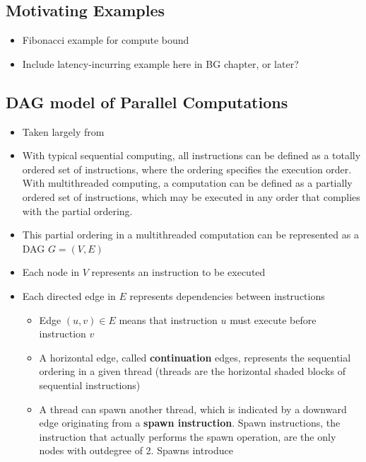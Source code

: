 \documentclass[bsc,frontabs,singlespacing,parskip,deptreport,normalheadings]{infthesis}
\begin{document}
\subsection{Motivating Examples}

\begin{itemize}
    \item Fibonacci example for compute bound
    \item Include latency-incurring example here in BG chapter, or later?
\end{itemize}

\subsection{DAG model of Parallel Computations}

\begin{itemize}
    \item Taken largely from \cite{cormen_introduction_2009, herlihy_art_2012,
        blumofe_executing_1995}
    \item With typical sequential computing, all instructions can be defined as
        a totally ordered set of instructions, where the ordering specifies the
        execution order. With multithreaded computing, a computation can be
        defined as a partially ordered set of instructions, which may be
        executed in any order that complies with the partial ordering.
    \item This partial ordering in a multithreaded computation can be
        represented as a DAG \(G = (V, E)\)
    \item Each node in \(V\) represents an instruction to be executed
    \item Each directed edge in \(E\) represents dependencies between
        instructions
    \begin{itemize}
        \item Edge \((u,v) \in E\) means that instruction \(u\) must execute
            before instruction \(v\)
        \item A horizontal edge, called \textbf{continuation} edges, represents
            the sequential ordering in a given thread (threads are the
            horizontal shaded blocks of sequential instructions)
        \item A thread can spawn another thread, which is indicated by a
            downward edge originating from a \textbf{spawn instruction}. Spawn
            instructions, the instruction that actually performs the spawn
            operation, are the only nodes with outdegree of 2. Spawns introduce

\end{itemize}
\end{itemize}
\end{document}
